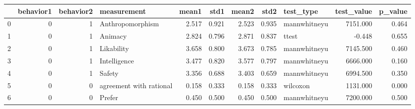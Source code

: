 \begin{tabular}{lrrlrrrrlrr}
\toprule
{} &  behavior1 &  behavior2 &              measurement &  mean1 &   std1 &  mean2 &   std2 &     test\_type &  test\_value &  p\_value \\
\midrule
0 &          0 &          1 &         Anthropomorphism &  2.517 &  0.921 &  2.523 &  0.935 &  mannwhitneyu &    7151.000 &    0.464 \\
1 &          0 &          1 &                  Animacy &  2.824 &  0.796 &  2.871 &  0.837 &         ttest &      -0.448 &    0.655 \\
2 &          0 &          1 &               Likability &  3.658 &  0.800 &  3.673 &  0.785 &  mannwhitneyu &    7145.500 &    0.460 \\
3 &          0 &          1 &             Intelligence &  3.477 &  0.820 &  3.577 &  0.797 &  mannwhitneyu &    6666.000 &    0.160 \\
4 &          0 &          1 &                   Safety &  3.356 &  0.688 &  3.403 &  0.659 &  mannwhitneyu &    6994.500 &    0.350 \\
5 &          0 &          0 &  agreement with rational &  0.158 &  0.333 &  0.158 &  0.333 &      wilcoxon &    1131.000 &    0.000 \\
6 &          0 &          0 &                   Prefer &  0.450 &  0.500 &  0.450 &  0.500 &  mannwhitneyu &    7200.000 &    0.500 \\
\bottomrule
\end{tabular}

